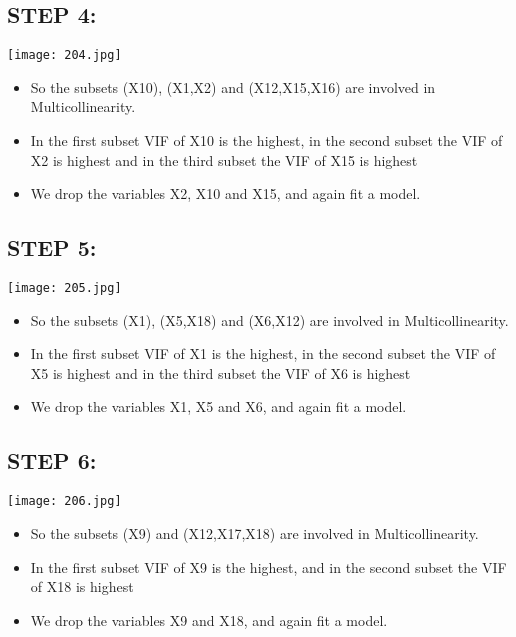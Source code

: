 \documentclass[a4paper,12pt,twoside]{book}
\begin{document}
\subsection*{STEP 4:}
\begin{center}
\texttt{[image: 204.jpg]}\\
\end{center}
\begin{center}
\begin{itemize}
\item So the subsets (X10), (X1,X2) and (X12,X15,X16) are involved in Multicollinearity.\\
\item In the first subset VIF of X10 is the highest, in the second subset the VIF of X2 is highest and in the third subset the VIF of X15 is highest\\
\item We drop the variables X2, X10 and X15, and again fit a model.\\
\end{itemize}
\subsection*{STEP 5:}
\begin{center}
\texttt{[image: 205.jpg]}\\
\end{center}
\begin{itemize}
\item So the subsets (X1), (X5,X18) and (X6,X12) are involved in Multicollinearity.\\
\item In the first subset VIF of X1 is the highest, in the second subset the VIF of X5 is highest and in the third subset the VIF of X6 is highest\\
\item We drop the variables X1, X5 and X6, and again fit a model.\\
\end{itemize}
\subsection*{STEP 6:}
\begin{center}
\texttt{[image: 206.jpg]}\\
\end{center}
\end{center}
\begin{itemize}
\item So the subsets (X9) and (X12,X17,X18) are involved in Multicollinearity.\\
\item In the first subset VIF of X9 is the highest, and in the second subset the VIF of X18 is highest\\
\item We drop the variables X9 and X18, and again fit a model.\\
\end{itemize}
\end{document}
